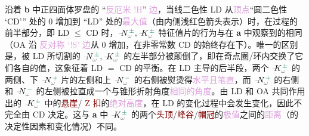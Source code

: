 沿着 \textbf{b} 中\textcolor{NavyBlue}{正四面体罗盘}的 “\textcolor{Plum}{反厄米 $!$H}” \textcolor{Plum}{边}，当\textcolor{NavyBlue}{线二色性 LD} 从\textcolor{Plum}{顶点}“\textcolor{NavyBlue}{圆二色性 `CD'}” 处的 0 增加到 “\textcolor{NavyBlue}{LD}” 处的\textcolor{Plum}{最大值}（由内侧浅红色箭头表示）时，在过程的前半部分，即 \textcolor{NavyBlue}{LD} $\leq$ \textcolor{NavyBlue}{CD} 时，$\Xint{\mathcolor{gray}{-}}{10}{N}^{\;\!\textcolor{PineGreen}{\pm}}_{\mathcolor{gray}{\omega}}, \Xint{\mathcolor{gray}{-}}{10}{K}^{\;\!\textcolor{PineGreen}{\pm}}_{\mathcolor{gray}{\omega}}$ \textcolor{PineGreen}{特征值片}的行为与在 \textbf{a} 中观察到的相同（\textcolor{NavyBlue}{OA} 沿 \textcolor{Plum}{反对称 `!S' 边}从 0 增加，在非零常数 \textcolor{NavyBlue}{CD} 的始终存在下）。唯一的区别是，被 \textcolor{NavyBlue}{LD} 所切割的 $\Xint{\mathcolor{gray}{-}}{10}{N}^{\;\!\textcolor{PineGreen}{\pm}}_{\mathcolor{gray}{\omega}}, \Xint{\mathcolor{gray}{-}}{10}{K}^{\;\!\textcolor{PineGreen}{\pm}}_{\mathcolor{gray}{\omega}}$ 的左半部分被颠倒了，即在\textcolor{PineGreen}{奇点圈}/\textcolor{PineGreen}{环}内交换了它们各自的值，这象征着 \textcolor{NavyBlue}{LD} $=$ \textcolor{NavyBlue}{CD} 的平衡。在 \textcolor{NavyBlue}{LD} 主导的后半段，两个 $\Xint{\mathcolor{gray}{-}}{10}{K}^{\;\!\textcolor{PineGreen}{\pm}}_{\mathcolor{gray}{\omega}}$ 的两侧、下 $\Xint{\mathcolor{gray}{-}}{10}{N}^{\;\!\textcolor{PineGreen}{+}}_{\mathcolor{gray}{\omega}}$ 片的左侧和上 $\Xint{\mathcolor{gray}{-}}{10}{N}^{\;\!\textcolor{PineGreen}{-}}_{\mathcolor{gray}{\omega}}$ 的右侧被熨烫得\textcolor{Plum}{水平且笔直}，而 $\Xint{\mathcolor{gray}{-}}{10}{N}^{\;\!\textcolor{PineGreen}{+}}_{\mathcolor{gray}{\omega}}$ 的右侧和 $\Xint{\mathcolor{gray}{-}}{10}{N}^{\;\!\textcolor{PineGreen}{-}}_{\mathcolor{gray}{\omega}}$ 的左侧被拉直成一个与\textcolor{PineGreen}{锥形折射}角度\textcolor{Plum}{相同的角度}。由 \textcolor{NavyBlue}{LD} 和 \textcolor{NavyBlue}{OA} 共同作用出的 $\Xint{\mathcolor{gray}{-}}{10}{K}^{\;\!\textcolor{PineGreen}{\pm}}_{\mathcolor{gray}{\omega}}$ 中的\textcolor{Maroon}{悬崖}/ \textcolor{Maroon}{Z 扣}的\textcolor{Plum}{绝对高度}，在 \textcolor{NavyBlue}{LD} 的变化过程中会发生变化，因此不完全由 \textcolor{NavyBlue}{CD} 决定。这与 \textbf{a} 中 $\Xint{\mathcolor{gray}{-}}{10}{K}^{\;\!\textcolor{PineGreen}{\pm}}_{\mathcolor{gray}{\omega}}$ 的两个\textcolor{Maroon}{头顶}/\textcolor{Maroon}{峰谷}/\textcolor{Maroon}{帽冠}的\textcolor{Plum}{极值}之间的\textcolor{Plum}{距离}（的决定性因素和变化情况）不同。

